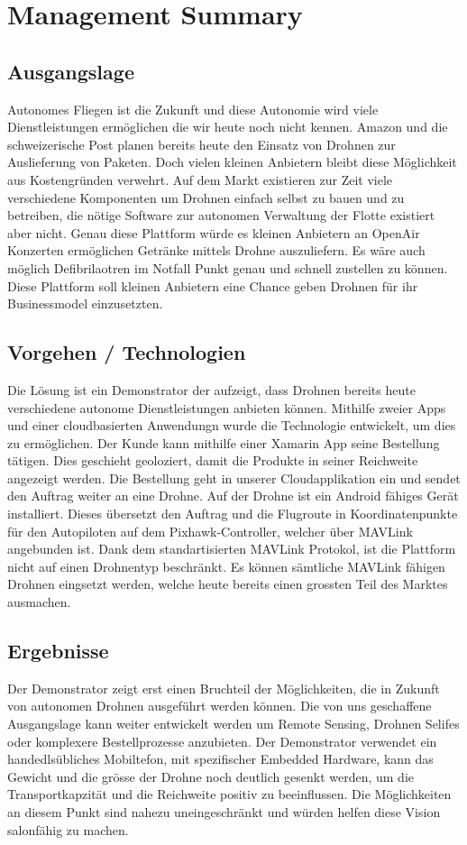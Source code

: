 \newpage
{}
\chapter*{Management Summary}
\section*{Ausgangslage}
Autonomes Fliegen ist die Zukunft und diese Autonomie wird viele Dienstleistungen ermöglichen die wir heute noch nicht kennen. Amazon und die schweizerische Post planen bereits heute den Einsatz von Drohnen zur Auslieferung von Paketen. Doch vielen kleinen Anbietern bleibt diese Möglichkeit aus Kostengründen verwehrt. Auf dem Markt existieren zur Zeit viele verschiedene Komponenten um Drohnen einfach selbst zu bauen und zu betreiben, die nötige Software zur autonomen Verwaltung der Flotte existiert aber nicht. Genau diese Plattform würde es kleinen Anbietern an OpenAir Konzerten ermöglichen Getränke mittels Drohne auszuliefern. Es wäre auch möglich Defibrilaotren im Notfall Punkt genau und schnell zustellen zu können. Diese Plattform soll kleinen Anbietern eine Chance geben Drohnen für ihr Businessmodel einzusetzten.
\section*{Vorgehen / Technologien}
Die Lösung ist ein Demonstrator der aufzeigt, dass Drohnen bereits heute verschiedene autonome Dienstleistungen anbieten können. Mithilfe zweier Apps und einer cloudbasierten Anwendungn wurde die Technologie entwickelt, um dies zu ermöglichen. Der Kunde kann mithilfe einer Xamarin App seine Bestellung tätigen. Dies geschieht geoloziert, damit die Produkte in seiner Reichweite angezeigt werden. Die Bestellung geht in unserer Cloudapplikation ein und sendet den Auftrag weiter an eine Drohne. Auf der Drohne ist ein Android fähiges Gerät installiert. Dieses übersetzt den Auftrag und die Flugroute in Koordinatenpunkte für den Autopiloten auf dem Pixhawk-Controller, welcher über MAVLink angebunden ist. Dank dem standartisierten MAVLink Protokol, ist die Plattform nicht auf einen Drohnentyp beschränkt. Es können sämtliche MAVLink fähigen Drohnen eingsetzt werden, welche heute bereits einen grossten Teil des Marktes ausmachen.

\section*{Ergebnisse}
Der Demonstrator zeigt erst einen Bruchteil der Möglichkeiten, die in Zukunft von autonomen Drohnen ausgeführt werden können. Die von uns geschaffene Ausgangslage kann weiter entwickelt werden um Remote Sensing, Drohnen Selifes oder komplexere Bestellprozesse anzubieten. Der Demonstrator verwendet ein handedlsübliches Mobiltefon, mit spezifischer Embedded Hardware, kann das Gewicht und die grösse der Drohne noch deutlich gesenkt werden, um die Transportkapzität und die Reichweite positiv zu beeinflussen. Die Möglichkeiten an diesem Punkt sind nahezu uneingeschränkt und würden helfen diese Vision salonfähig zu machen.